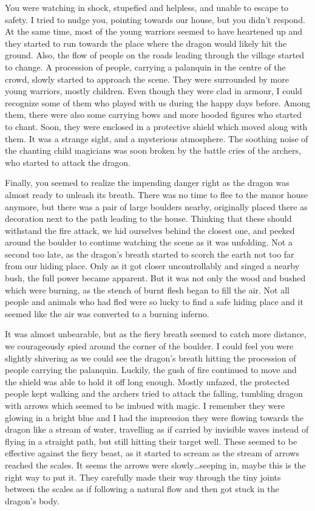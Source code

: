 You were watching in shock, stupefied and helpless, and unable to escape to safety. I tried to nudge you, pointing towards our house, but you didn't respond. At the same time, most of the young warriors seemed to have heartened up and they started to run towards the place where the dragon would likely hit the ground. Also, the flow of people on the roads leading through the village started to change. A procession of people, carrying a palanquin in the centre of the crowd, slowly started to approach the scene. They were surrounded by more young warriors, mostly children. Even though they were clad in armour, I could recognize some of them who played with us during the happy days before. Among them, there were also some carrying bows and more hooded figures who started to chant. Soon, they were enclosed in a protective shield which moved along with them. It was a strange sight, and a mysterious atmosphere. The soothing noise of the chanting child magicians was soon broken by the battle cries of the archers, who started to attack the dragon.

Finally, you seemed to realize the impending danger right as the dragon was almost ready to unleash its breath. There was no time to flee to the manor house anymore, but there was a pair of large boulders nearby, originally placed there as decoration next to the path leading to the house. Thinking that these should withstand the fire attack, we hid ourselves behind the closest one, and peeked around the boulder to continue watching the scene as it was unfolding. Not a second too late, as the dragon's breath started to scorch the earth not too far from our hiding place. Only as it got closer uncontrollably and singed a nearby bush, the full power became apparent. But it was not only the wood and bushed which were burning, as the stench of burnt flesh began to fill the air. Not all people and animals who had fled were so lucky to find a safe hiding place and it seemed like the air was converted to a burning inferno.

It was almost unbearable, but as the fiery breath seemed to catch more distance, we courageously spied around the corner of the boulder. I could feel you were slightly shivering as we could see the dragon's breath hitting the procession of people carrying the palanquin. Luckily, the gush of fire continued to move and the shield was able to hold it off long enough. Mostly unfazed, the protected people kept walking and the archers tried to attack the falling, tumbling dragon with arrows which seemed to be imbued with magic. I remember they were glowing in a bright blue and I had the impression they were flowing towards the dragon like a stream of water, travelling as if carried by invisible waves instead of flying in a straight path, but still hitting their target well. These seemed to be effective against the fiery beast, as it started to scream as the stream of arrows reached the scales. It seems the arrows were slowly\dots seeping in, maybe this is the right way to put it. They carefully made their way through the tiny joints between the scales as if following a natural flow and then got stuck in the dragon's body.

